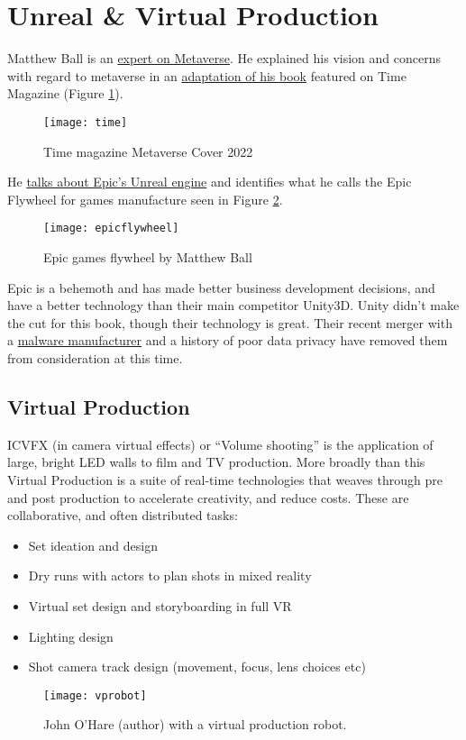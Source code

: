 \section{Unreal \& Virtual Production}
Matthew Ball is an \href{https://www.matthewball.vc/}{expert on Metaverse}. He explained his vision and concerns with regard to metaverse in an \href{https://time.com/6197849/metaverse-future-matthew-ball/}{adaptation of his book}\cite{ball2020metaverse} featured on Time Magazine (Figure \ref{fig:time}).\par
\begin{figure}
  \centering
    \texttt{[image: time]}
  \caption{Time magazine Metaverse Cover 2022}
  \label{fig:time}
\end{figure}
He \href{https://www.matthewball.vc/all/epicprimer1}{talks about Epic's Unreal engine} and identifies what he calls the Epic Flywheel for games manufacture seen in Figure \ref{fig:epicflywheel}.\par
\begin{figure}
  \centering
    \texttt{[image: epicflywheel]}
  \caption{Epic games flywheel by Matthew Ball}
  \label{fig:epicflywheel}
\end{figure}
Epic is a behemoth and has made better business development decisions, and have a better technology than their main competitor Unity3D. Unity didn't make the cut for this book, though their technology is great. Their recent merger with a \href{https://www.pcgamer.com/unity-is-merging-with-a-company-who-made-a-malware-installer/}{malware manufacturer} and a history of poor data privacy have removed them from consideration at this time.
\subsection{Virtual Production}

ICVFX (in camera virtual effects) or ``Volume shooting'' is the application of large, bright LED walls to film and TV production. More broadly than this Virtual Production is a suite of real-time technologies that weaves through pre and post production to accelerate creativity, and reduce costs.
These are collaborative, and often distributed tasks:
\begin{itemize}
\item Set ideation and design
\item Dry runs with actors to plan shots in mixed reality
\item Virtual set design and storyboarding in full VR
\item Lighting design
\item Shot camera track design (movement, focus, lens choices etc)
\end{itemize}
\begin{figure}[ht]
  \centering
    \texttt{[image: vprobot]}
  \caption{John O'Hare (author) with a virtual production robot.}
  \label{fig:vprobot}
\end{figure}
